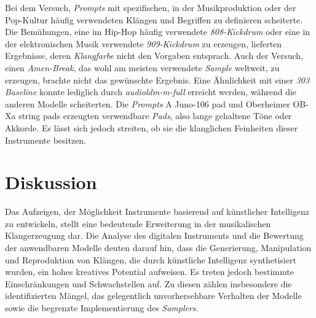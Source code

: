 \documentclass[
  a4paper,  %
  twoside,  %
  bibliography=totoc,
  headsepline,
  cleardoublepage=empty,
  parskip=half,
  draft=false
]{scrbook}
\begin{document}
Bei dem Versuch, \emph{Prompts} mit spezifischen, in der Musikproduktion oder der Pop-Kultur häufig verwendeten Klängen und Begriffen zu definieren scheiterte. Die Bemühungen, eine im Hip-Hop häufig verwendete \emph{808-Kickdrum} oder eine in der elektronischen Musik verwendete \emph{909-Kickdrum} zu erzeugen, lieferten Ergebnisse, deren \emph{Klangfarbe} nicht den Vorgaben entsprach. Auch der Versuch, einen \emph{Amen-Break}, das wohl am meisten verwendete \emph{Sample} weltweit, zu erzeugen, brachte nicht das gewünschte Ergebnis. Eine Ähnlichkeit mit einer \emph{303 Baseline} konnte lediglich durch \emph{audioldm-m-full} erreicht werden, während die anderen Modelle scheiterten. Die \emph{Prompts} \glqq A Juno-106 pad\grqq{} und \glqq Oberheimer OB-Xa string pads\grqq{} erzeugten verwendbare \emph{Pads}, also lange gehaltene Töne oder Akkorde. Es lässt sich jedoch streiten, ob sie die klanglichen Feinheiten dieser Instrumente besitzen. 

\chapter{Diskussion}
Das Aufzeigen, der Möglichkeit Instrumente basierend auf künstlicher Intelligenz zu entwickeln, stellt eine bedeutende Erweiterung in der musikalischen Klangerzeugung dar. Die Analyse des digitalen Instruments und die Bewertung der anwendbaren Modelle deuten darauf hin, dass die Generierung, Manipulation und Reproduktion von Klängen, die durch künstliche Intelligenz synthetisiert wurden, ein hohes kreatives Potential aufweisen. Es treten jedoch bestimmte Einschränkungen und Schwachstellen auf. Zu diesen zählen insbesondere die identifizierten Mängel, das gelegentlich unvorhersehbare Verhalten der Modelle sowie die begrenzte Implementierung des \emph{Samplers}.
\end{document}
